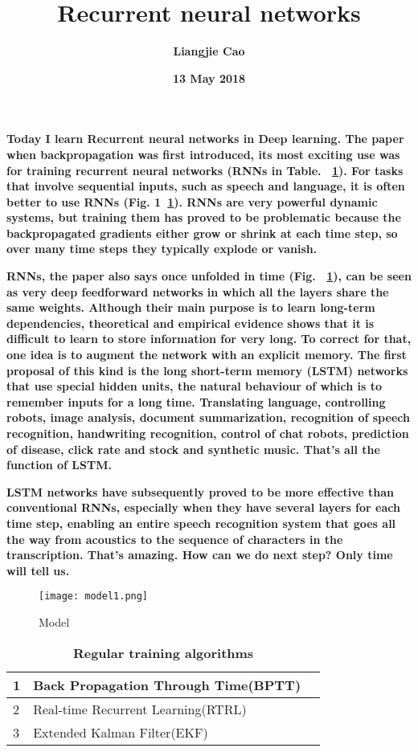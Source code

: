 \documentclass[20pt]{article}
\begin{document}
\title{\textbf{Recurrent neural networks}}
\author{\textbf{Liangjie Cao}}
\date{\textbf{13 May 2018}}
\maketitle
\par
\textbf{Today I learn Recurrent neural networks in Deep learning. The paper when backpropagation was first introduced, its most exciting use was for training recurrent neural networks (RNNs in Table. ~\ref{Table1}). For tasks that involve sequential inputs, such as speech and language, it is often better to use RNNs (Fig. 1~\ref{Figure1}). RNNs are very powerful dynamic systems, but training them has proved to be problematic because the backpropagated gradients either grow or shrink at each time step, so over many time steps they typically explode or vanish.\cite{name1}}
\par
\textbf{RNNs, the paper also says once unfolded in time (Fig. ~\ref{Figure1}), can be seen as very deep feedforward networks in which all the layers share the same weights. Although their main purpose is to learn long-term dependencies, theoretical and empirical evidence shows that it is difficult to learn to store information for very long. To correct for that, one idea is to augment the network with an explicit memory. The first proposal of this kind is the long short-term memory (LSTM) networks that use special hidden units, the natural behaviour of which is to remember inputs for a long time. Translating language, controlling robots, image analysis, document summarization, recognition of speech recognition, handwriting recognition, control of chat robots, prediction of disease, click rate and stock and synthetic music. That's all the function of LSTM. }
\par
\textbf{LSTM networks have subsequently proved to be more effective than conventional RNNs, especially when they have several layers for each time step, enabling an entire speech recognition system that goes all the way from acoustics to the sequence of characters in the transcription. That's amazing. How can we do next step? Only time will tell us. }\\
\newpage
\onecolumn
 \begin{figure}[htbp]
 \centering
 \texttt{[image: model1.png]}\\
 \caption{Model}\label{Figure1}
\end{figure}
 \begin{table}[!htbp]
  \centering
 \begin{tabular}{|p{5cm}|p{5cm}|p{5cm}}
    \hline
    1 & Back Propagation Through Time(BPTT)\\
    \hline
    2 & Real-time Recurrent Learning(RTRL) \\
    \hline
    3 & Extended Kalman Filter(EKF) \\
    \hline
  \end{tabular}
  \caption{\textbf{Regular training algorithms}} \label{Table1}
  \end{table}
  

\end{document}
